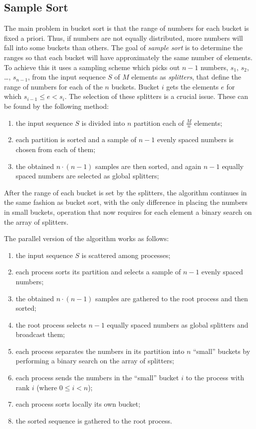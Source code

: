 \subsection{Sample Sort}
The main problem in bucket sort is that the range of numbers for each bucket is fixed a priori. Thus, if numbers are not equally distributed, more numbers will fall into some buckets than others.
The goal of \textit{sample sort} is to determine the ranges so that each bucket will have approximately the same number of elements. To achieve this it uses a sampling scheme which picks out $n-1$ numbers, $s_1$, $s_2$, \dots, $s_{n-1}$, from the input sequence $S$ of $M$ elements as \textit{splitters}, that define the range of numbers for each of the $n$ buckets. Bucket $i$ gets the elements $e$ for which $s_{i-1} \leq e < s_i$. The selection of these splitters is a crucial issue. These can be found by the following method:
\begin{enumerate}	
	\item the input sequence $S$ is divided into $n$ partition each of $\frac{M}{n}$ elements;
	\item each partition is sorted and a sample of $n-1$ evenly spaced numbers is chosen from each of them;
	\item the obtained $n \cdot (n-1)$ samples are then sorted, and again $n-1$ equally spaced numbers are selected as global splitters;
\end{enumerate}
After the range of each bucket is set by the splitters, the algorithm continues in the same fashion as bucket sort, with the only difference in placing the numbers in small buckets, operation that now requires for each element a binary search on the array of splitters.

The parallel version of the algorithm works as follows:
\begin{enumerate}	
	\item the input sequence $S$ is scattered among processes;
	\item each process sorts its partition and selects a sample of $n-1$ evenly spaced numbers;
	\item the obtained $n \cdot (n-1)$ samples are gathered to the root process and then sorted;
	\item the root process selects $n-1$ equally spaced numbers as global splitters and broadcast them;
	\item each process separates the numbers in its partition into $n$ ``small'' buckets by performing a binary search on the array of splitters;
	\item each process sends the numbers in the ``small'' bucket $i$ to the process with rank $i$ (where $0 \leq i < n$);
	\item each process sorts locally its own bucket;
	\item the sorted sequence is gathered to the root process.
\end{enumerate}

